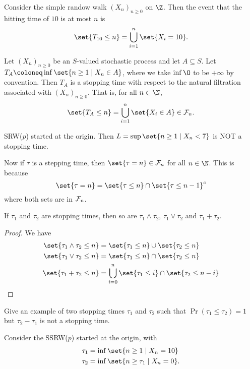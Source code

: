 Consider the simple randow walk $(X_n)_{n \ge 0}$ on $\Z$.
Then the event that the hitting time of $10$ is at most $n$ is \[
    \set{T_{10} \le n} = \bigcup_{i=1}^{n} \set{X_i = 10}.
\]
\begin{examples}
    \item Let $(X_n)_{n \ge 0}$ be an $S$-valued stochastic process and let
    $A \subseteq S$.
    Let $T_A \coloneq \inf\set{n \ge 1 \mid X_n \in A}$, where we take
    $\inf \O$ to be $+\infty$ by convention.
    Then $T_A$ is a stopping time with respect to the natural filtration
    associated with $(X_n)_{n \ge 0}$.
    That is, for all $n \in \N$, \[
        \set{T_A \le n} = \bigcup_{i=1}^{n} \set{X_i \in A} \in \F_n.
    \]
    \item SRW($p$) started at the origin.
    Then $L = \sup \set{n \ge 1 \mid X_n < 7}$ is NOT a stopping time.
\end{examples}
Now if $\tau$ is a stepping time, then $\set{\tau = n} \in \F_n$ for all
$n \in \N$.
This is because \[
    \set{\tau = n} = \set{\tau \le n} \cap \set{\tau \le n-1}^c
\] where both sets are in $\mathcal{F}_n$.

\begin{proposition}
    If $\tau_1$ and $\tau_2$ are stopping times, then so are
    $\tau_1 \wedge \tau_2$, $\tau_1 \vee \tau_2$ and $\tau_1 + \tau_2$.
\end{proposition}
\begin{proof}
    We have \begin{align*}
        \set{\tau_1 \wedge \tau_2 \le n}
            &= \set{\tau_1 \le n} \cup \set{\tau_2 \le n} \\
        \set{\tau_1 \vee \tau_2 \le n}
            &= \set{\tau_1 \le n} \cap \set{\tau_2 \le n} \\
        \set{\tau_1 + \tau_2 \le n}
            &= \bigcup_{i=0}^{n} \set{\tau_1 \le i} \cap \set{\tau_2 \le n-i}
    \end{align*}
\end{proof}

\begin{problem}
    Give an example of two stopping times $\tau_1$ and $\tau_2$ such that
    $\Pr(\tau_1 \le \tau_2) = 1$ but $\tau_2 - \tau_1$ is not a stopping
    time.
\end{problem}
\begin{solution}
    Consider the SSRW($p$) started at the origin, with \begin{align*}
        \tau_1 &= \inf\set{n \ge 1 \mid X_n = 10} \\
        \tau_2 &= \inf\set{n \ge \tau_1 \mid X_n = 0}.
    \end{align*}
\end{solution}

